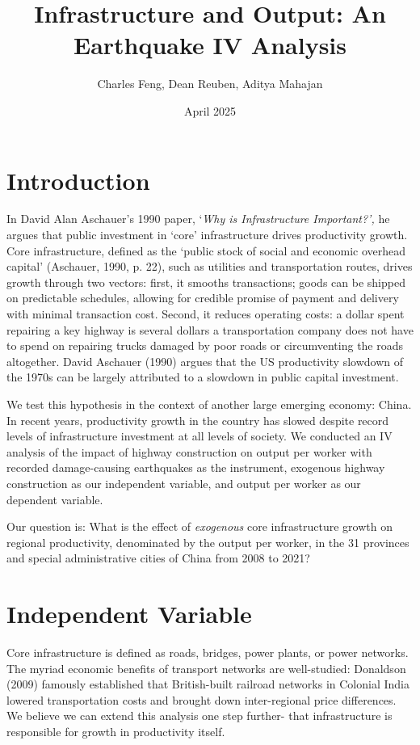 \documentclass[11pt]{article}
\title{Infrastructure and Output: An Earthquake IV Analysis }
\author{Charles Feng, Dean Reuben, Aditya Mahajan}
\date{April 2025}
\begin{document}
\maketitle

\section{Introduction}

In David Alan Aschauer’s 1990 paper, ‘\textit{Why is Infrastructure Important?’, }he argues that public investment in ‘core’ infrastructure drives productivity growth. Core infrastructure, defined as the ‘public stock of social and economic overhead capital’ (Aschauer, 1990, p. 22), such as utilities and transportation routes, drives growth through two vectors: first, it smooths transactions; goods can be shipped on predictable schedules, allowing for credible promise of payment and delivery with minimal transaction cost. Second, it reduces operating costs: a dollar spent repairing a key highway is several dollars a transportation company does not have to spend on repairing trucks damaged by poor roads or circumventing the roads altogether. David Aschauer (1990) argues that the US productivity slowdown of the 1970s can be largely attributed to a slowdown in public capital investment. 

We test this hypothesis in the context of another large emerging economy: China. In recent years, productivity growth in the country has slowed despite record levels of infrastructure investment at all levels of society. We conducted an IV analysis of the impact of highway construction on output per worker with recorded damage-causing earthquakes as the instrument, exogenous highway construction as our independent variable, and output per worker as our dependent variable. 

Our question is: What is the effect of \textit{ exogenous } core infrastructure growth on regional productivity, denominated by the output per worker, in the 31 provinces and special administrative cities of China from 2008 to 2021?  

\section{Independent Variable}

Core infrastructure is defined as roads, bridges, power plants, or power networks. The myriad economic benefits of transport networks are well-studied: Donaldson (2009) famously established that British-built railroad networks in Colonial India lowered transportation costs and brought down inter-regional price differences. We believe we can extend this analysis one step further- that infrastructure is responsible for growth in productivity itself. 
\end{document}
